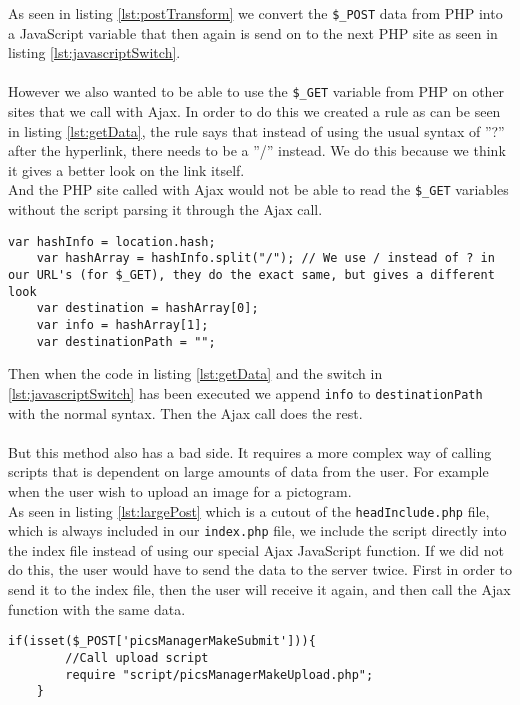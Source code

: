 As seen in listing \ref{lst:postTransform} we convert the \texttt{\$\_POST} data from PHP into a JavaScript variable that then again is send on to the next PHP site as seen in listing \ref{lst:javascriptSwitch}.\\
\\
However we also wanted to be able to use the \texttt{\$\_GET} variable from PHP on other sites that we call with Ajax. In order to do this we created a rule as can be seen in listing \ref{lst:getData}, the rule says that instead of using the usual syntax of ''?'' after the hyperlink, there needs to be a ''/'' instead. We do this because we think it gives a better look on the link itself.\\
And the PHP site called with Ajax would not be able to read the \texttt{\$\_GET} variables without the script parsing it through the Ajax call.

\lstset{language=Java}
\begin{lstlisting}[firstline=1,caption={The GET transform code},label=lst:getData]
    var hashInfo = location.hash;    
	var hashArray = hashInfo.split("/"); // We use / instead of ? in our URL's (for $_GET), they do the exact same, but gives a different look
	var destination = hashArray[0];
	var info = hashArray[1];
	var destinationPath = "";
\end{lstlisting}

Then when the code in listing \ref{lst:getData} and the switch in \ref{lst:javascriptSwitch} has been executed we append \texttt{info} to \texttt{destinationPath} with the normal syntax. Then the Ajax call does the rest.\\
\\
But this method also has a bad side. It requires a more complex way of calling scripts that is dependent on large amounts of data from the user. For example when the user wish to upload an image for a pictogram.\\
As seen in listing \ref{lst:largePost} which is a cutout of the \texttt{headInclude.php} file, which is always included in our \texttt{index.php} file, we include the script directly into the index file instead of using our special Ajax JavaScript function. If we did not do this, the user would have to send the data to the server twice. First in order to send it to the index file, then the user will receive it again, and then call the Ajax function with the same data.\\

\lstset{language=PHP}
\begin{lstlisting}[firstline=1,caption={The handling of big PHP POSTs},label=lst:largePost]
	if(isset($_POST['picsManagerMakeSubmit'])){
		//Call upload script
		require "script/picsManagerMakeUpload.php";
	}
\end{lstlisting}

